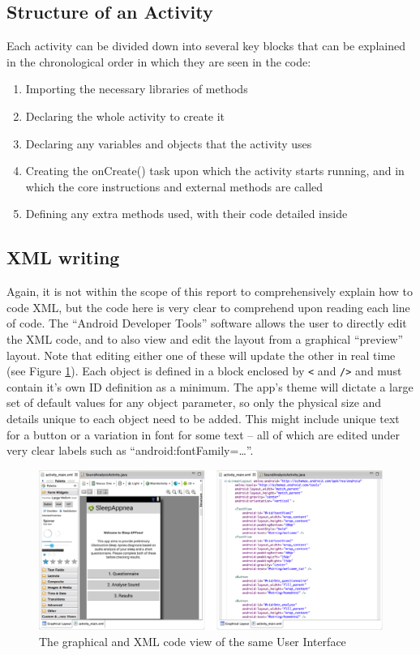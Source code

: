 \subsection{Structure of an Activity}
Each activity can be divided down into several key blocks that can be explained in the chronological order in which they are seen in the code:
\begin{enumerate}
\item Importing the necessary libraries of methods
\item Declaring the whole activity to create it
\item Declaring any variables and objects that the activity uses
\item Creating the onCreate() task upon which the activity starts running, and in which the core instructions and external methods are called
\item Defining any extra methods used, with their code detailed inside
\end{enumerate}
\subsection{XML writing}
Again, it is not within the scope of this report to comprehensively explain how to code XML, but the code here is very clear to comprehend upon reading each line of code. The ``Android Developer Tools'' software allows the user to directly edit the XML code, and to also view and edit the layout from a graphical ``preview'' layout. Note that editing either one of these will update the other in real time (see Figure \ref{fig:xmlPages}). Each object is defined in a block enclosed by \verb!<! and \verb!/>!  and must contain it’s own ID definition as a minimum. The app’s theme will dictate a large set of default values for any object parameter, so only the physical size and details unique to each object need to be added. This might include unique text for a button or a variation in font for some text – all of which are edited under very clear labels such as ``android:fontFamily=\dots''.
\begin{figure}[ht!]
		\centering
			\includegraphics[width=.9\textwidth]{drawings/XML_page.png}
		\caption{The graphical and XML code view of the same User Interface}
		\label{fig:xmlPages}
	\end{figure}

